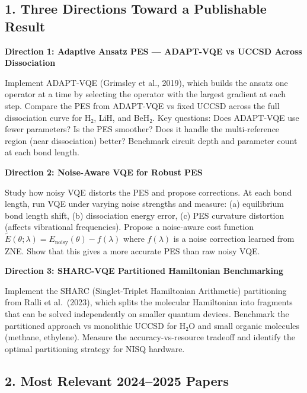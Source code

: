 \documentclass[
  11pt,
]{report}
\begin{document}
\subsection{1. Three Directions Toward a Publishable
Result}\label{three-directions-toward-a-publishable-result}

\textbf{Direction 1: Adaptive Ansatz PES --- ADAPT-VQE vs UCCSD Across
Dissociation}

Implement ADAPT-VQE (Grimsley et al., 2019), which builds the ansatz one
operator at a time by selecting the operator with the largest gradient
at each step. Compare the PES from ADAPT-VQE vs fixed UCCSD across the
full dissociation curve for H₂, LiH, and BeH₂. Key questions: Does
ADAPT-VQE use fewer parameters? Is the PES smoother? Does it handle the
multi-reference region (near dissociation) better? Benchmark circuit
depth and parameter count at each bond length.

\textbf{Direction 2: Noise-Aware VQE for Robust PES}

Study how noisy VQE distorts the PES and propose corrections. At each
bond length, run VQE under varying noise strengths and measure: (a)
equilibrium bond length shift, (b) dissociation energy error, (c) PES
curvature distortion (affects vibrational frequencies). Propose a
noise-aware cost function
\(\tilde{E}(\theta; \lambda) = E_{\text{noisy}}(\theta) - f(\lambda)\)
where \(f(\lambda)\) is a noise correction learned from ZNE. Show that
this gives a more accurate PES than raw noisy VQE.

\textbf{Direction 3: SHARC-VQE Partitioned Hamiltonian Benchmarking}

Implement the SHARC (Singlet-Triplet Hamiltonian Arithmetic)
partitioning from Ralli et al.~(2023), which splits the molecular
Hamiltonian into fragments that can be solved independently on smaller
quantum devices. Benchmark the partitioned approach vs monolithic UCCSD
for H₂O and small organic molecules (methane, ethylene). Measure the
accuracy-vs-resource tradeoff and identify the optimal partitioning
strategy for NISQ hardware.

\subsection{2. Most Relevant 2024--2025
Papers}\label{most-relevant-20242025-papers}
\end{document}
